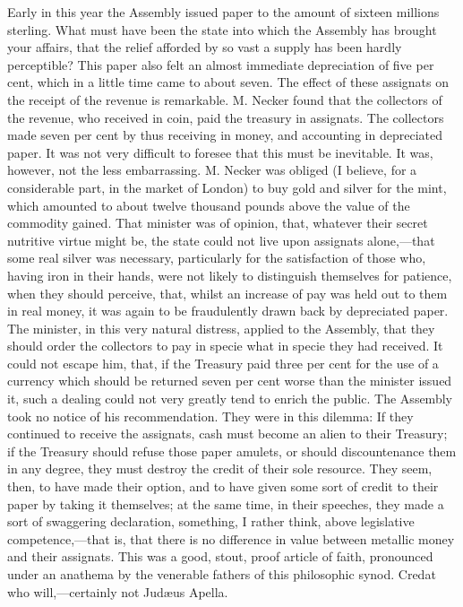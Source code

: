 Early in this year the Assembly issued paper to the amount of sixteen millions sterling. What must have been the state into which the Assembly has brought your affairs, that the relief afforded by so vast a supply has been hardly perceptible? This paper also felt an almost immediate depreciation of five per cent, which in a little time came to about seven. The effect of these assignats on the receipt of the revenue is remarkable. M. Necker found that the collectors of the revenue, who received in coin, paid the treasury in assignats. The collectors made seven per cent by thus receiving in money, and accounting in depreciated paper. It was not very difficult to foresee that this must be inevitable. It was, however, not the less embarrassing. M. Necker was obliged (I believe, for a considerable part, in the market of London) to buy gold and silver for the mint, which amounted to about twelve thousand pounds above the value of the commodity gained. That minister was of opinion, that, whatever their secret nutritive virtue might be, the state could not live upon assignats alone,—that some real silver was necessary, particularly for the satisfaction of those who, having iron in their hands, were not likely to distinguish themselves for patience, when they should perceive, that, whilst an increase of pay was held out to them in real money, it was again to be fraudulently drawn back by depreciated paper. The minister, in this very natural distress, applied to the Assembly, that they should order the collectors to pay in specie what in specie they had received. It could not escape him, that, if the Treasury paid three per cent for the use of a currency which should be returned seven per cent worse than the minister issued it, such a dealing could not very greatly tend to enrich the public. The Assembly took no notice of his recommendation. They were in this dilemma: If they continued to receive the assignats, cash must become an alien to their Treasury; if the Treasury should refuse those paper amulets, or should discountenance them in any degree, they must destroy the credit of their sole resource. They seem, then, to have made their option, and to have given some sort of credit to their paper by taking it themselves; at the same time, in their speeches, they made a sort of swaggering declaration, something, I rather think, above legislative competence,—that is, that there is no difference in value between metallic money and their assignats. This was a good, stout, proof article of faith, pronounced under an anathema by the venerable fathers of this philosophic synod. Credat who will,—certainly not Judæus Apella.

